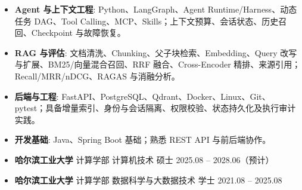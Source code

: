 \documentclass[zh]{resume}
\begin{document}
\makeheader

\begin{abstract}
求职方向：AI Agent、大模型应用开发与 RAG 工程化实习；一周内到岗。哈尔滨工业大学计算机技术硕士在读，预计 2028 年 6 月毕业。独立开发 ResearchClaw 科研 Agent，围绕个人论文库实现增量索引、混合检索、证据问答、单会话记忆与动态任务编排，具备从离线知识构建到在线检索生成、评估驱动优化的完整实践。
\end{abstract}

\begin{itemize}
\item \textbf{Agent 与上下文工程}: Python、LangGraph、Agent Runtime/Harness、动态任务 DAG、Tool Calling、MCP、Skills；上下文预算、会话状态、历史召回、Checkpoint 与故障恢复。
\item \textbf{RAG 与评估}: 文档清洗、Chunking、父子块检索、Embedding、Query 改写与扩展、BM25/向量混合召回、RRF 融合、Cross-Encoder 精排、来源引用；Recall/MRR/nDCG、RAGAS 与消融分析。
\item \textbf{后端与工程}: FastAPI、PostgreSQL、Qdrant、Docker、Linux、Git、pytest；具备增量索引、身份与会话隔离、权限校验、状态持久化及执行审计实践。
\item \textbf{开发基础}: Java、Spring Boot 基础；熟悉 REST API 与前后端协作。
\end{itemize}


\begin{itemize}

  \item \textbf{哈尔滨工业大学}
        \quad 计算学部
        \quad 计算机技术
        \quad 硕士
        \hfill 2025.08 -- 2028.06（预计）

  \item \textbf{哈尔滨工业大学}
        \quad 计算学部
        \quad 数据科学与大数据技术
        \quad 学士
        \hfill 2021.08 -- 2025.08


\end{itemize}
\end{document}
